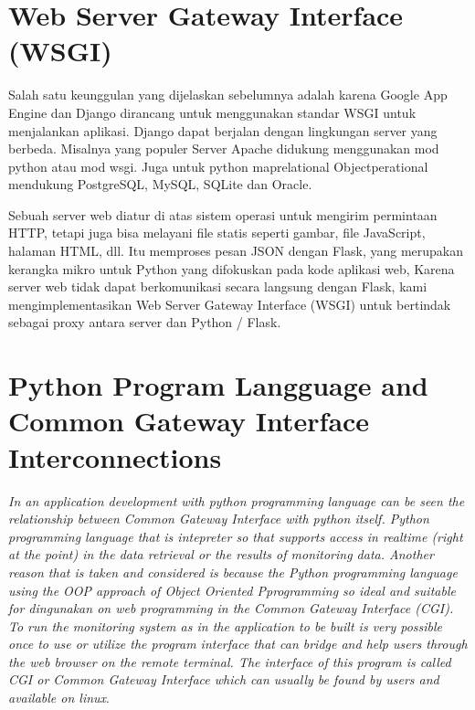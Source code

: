 \section{Web Server Gateway Interface (WSGI) }
Salah satu keunggulan yang dijelaskan sebelumnya adalah karena Google App Engine dan Django dirancang untuk menggunakan standar WSGI untuk menjalankan aplikasi.
Django dapat berjalan dengan lingkungan server yang berbeda. Misalnya yang populer Server Apache didukung menggunakan mod python atau mod wsgi.
Juga untuk python maprelational Objectperational mendukung PostgreSQL, MySQL, SQLite dan Oracle.

\par Sebuah server web diatur di atas sistem operasi untuk mengirim permintaan HTTP, tetapi juga bisa melayani file statis seperti gambar, file JavaScript, halaman HTML, dll.
 Itu memproses pesan JSON dengan Flask, yang merupakan kerangka mikro untuk Python yang difokuskan pada kode aplikasi web, Karena server web tidak dapat berkomunikasi
 secara langsung dengan Flask, kami mengimplementasikan Web Server Gateway Interface (WSGI) untuk bertindak sebagai proxy antara server dan Python / Flask.

\section{ Python Program Langguage and Common Gateway Interface Interconnections }
\textit {In an application development with python programming language can be seen the relationship between Common Gateway Interface with python itself. Python programming language that is intepreter so that supports access in realtime (right at the point) in the data retrieval or the results of monitoring data. Another reason that is taken and considered is because the Python programming language using the OOP approach of Object Oriented Pprogramming so ideal and suitable for dingunakan on web programming in the Common Gateway Interface (CGI). To run the monitoring system as in the application to be built is very possible once to use or utilize the program interface that can bridge and help users through the web browser on the remote terminal. The interface of this program is called CGI or Common Gateway Interface which can usually be found by users and available on linux}\cite{ohara2005aplikasi}.

